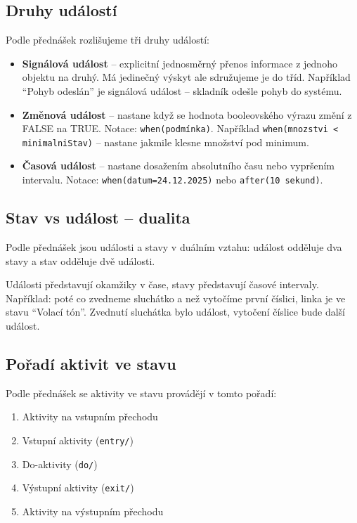 \documentclass[12pt, a4paper]{article}
\begin{document}
\subsection{Druhy událostí}

Podle přednášek rozlišujeme tři druhy událostí:

\begin{itemize}
  \item \textbf{Signálová událost} -- explicitní jednosměrný přenos informace z jednoho objektu na druhý. Má jedinečný výskyt ale sdružujeme je do tříd. Například ``Pohyb odeslán'' je signálová událost -- skladník odešle pohyb do systému.
  \item \textbf{Změnová událost} -- nastane když se hodnota booleovského výrazu změní z FALSE na TRUE. Notace: \texttt{when(podmínka)}. Například \texttt{when(mnozstvi < minimalniStav)} -- nastane jakmile klesne množství pod minimum.
  \item \textbf{Časová událost} -- nastane dosažením absolutního času nebo vypršením intervalu. Notace: \texttt{when(datum=24.12.2025)} nebo \texttt{after(10 sekund)}.
\end{itemize}

\subsection{Stav vs událost -- dualita}

Podle přednášek jsou události a stavy v duálním vztahu: událost odděluje dva stavy a stav odděluje dvě události.

Události představují okamžiky v čase, stavy představují časové intervaly. Například: poté co zvedneme sluchátko a než vytočíme první číslici, linka je ve stavu ``Volací tón''. Zvednutí sluchátka bylo událost, vytočení číslice bude další událost.

\subsection{Pořadí aktivit ve stavu}

Podle přednášek se aktivity ve stavu provádějí v tomto pořadí:
\begin{enumerate}
  \item Aktivity na vstupním přechodu
  \item Vstupní aktivity (\texttt{entry/})
  \item Do-aktivity (\texttt{do/})
  \item Výstupní aktivity (\texttt{exit/})
  \item Aktivity na výstupním přechodu
\end{enumerate}
\end{document}
